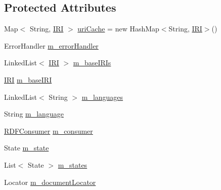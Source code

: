 \subsection*{Protected Attributes}
\begin{DoxyCompactItemize}
\item 
Map$<$ String, \hyperlink{classorg_1_1semanticweb_1_1owlapi_1_1model_1_1_i_r_i}{I\-R\-I} $>$ \hyperlink{classorg_1_1semanticweb_1_1owlapi_1_1rdf_1_1syntax_1_1_r_d_f_parser_a53ec39164fc596224b90ba1f59c3af67}{uri\-Cache} = new Hash\-Map$<$String, \hyperlink{classorg_1_1semanticweb_1_1owlapi_1_1model_1_1_i_r_i}{I\-R\-I}$>$()
\item 
Error\-Handler \hyperlink{classorg_1_1semanticweb_1_1owlapi_1_1rdf_1_1syntax_1_1_r_d_f_parser_a9f0e625e14277e4433aec9d6ad8a6562}{m\-\_\-error\-Handler}
\item 
Linked\-List$<$ \hyperlink{classorg_1_1semanticweb_1_1owlapi_1_1model_1_1_i_r_i}{I\-R\-I} $>$ \hyperlink{classorg_1_1semanticweb_1_1owlapi_1_1rdf_1_1syntax_1_1_r_d_f_parser_a46edf648348805dce745bb14a0a4a78e}{m\-\_\-base\-I\-R\-Is}
\item 
\hyperlink{classorg_1_1semanticweb_1_1owlapi_1_1model_1_1_i_r_i}{I\-R\-I} \hyperlink{classorg_1_1semanticweb_1_1owlapi_1_1rdf_1_1syntax_1_1_r_d_f_parser_a7dda66cd465ad55a417b443faf88084a}{m\-\_\-base\-I\-R\-I}
\item 
Linked\-List$<$ String $>$ \hyperlink{classorg_1_1semanticweb_1_1owlapi_1_1rdf_1_1syntax_1_1_r_d_f_parser_a8d969316e46825caba3f4c782fede6a7}{m\-\_\-languages}
\item 
String \hyperlink{classorg_1_1semanticweb_1_1owlapi_1_1rdf_1_1syntax_1_1_r_d_f_parser_a3463cccadecb04b34790f9dd2a3b090f}{m\-\_\-language}
\item 
\hyperlink{interfaceorg_1_1semanticweb_1_1owlapi_1_1rdf_1_1syntax_1_1_r_d_f_consumer}{R\-D\-F\-Consumer} \hyperlink{classorg_1_1semanticweb_1_1owlapi_1_1rdf_1_1syntax_1_1_r_d_f_parser_a87fa2cd0dc9128c761a0556e18363473}{m\-\_\-consumer}
\item 
State \hyperlink{classorg_1_1semanticweb_1_1owlapi_1_1rdf_1_1syntax_1_1_r_d_f_parser_a8071bbf18c1799e04752d6ca49db0357}{m\-\_\-state}
\item 
List$<$ State $>$ \hyperlink{classorg_1_1semanticweb_1_1owlapi_1_1rdf_1_1syntax_1_1_r_d_f_parser_aaa0800018efd6093d4792ac377a83222}{m\-\_\-states}
\item 
Locator \hyperlink{classorg_1_1semanticweb_1_1owlapi_1_1rdf_1_1syntax_1_1_r_d_f_parser_a92a0f2015d107ae0e9b2dff58c8a9e27}{m\-\_\-document\-Locator}
\end{DoxyCompactItemize}
